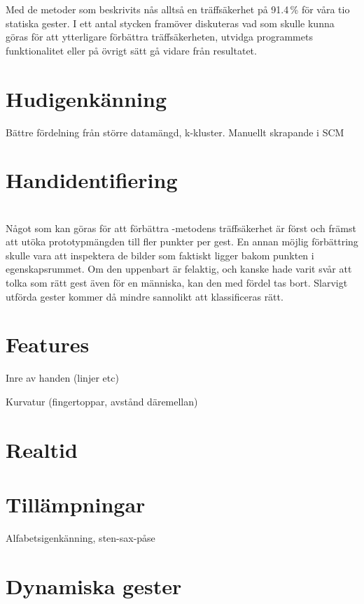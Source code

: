 \documentclass[../rapport_MVEX01-11-05]{subfiles}
\begin{document}
Med de metoder som beskrivits nås alltså en träffsäkerhet på 91.4\,\%
för våra tio statiska gester. I ett antal stycken framöver diskuteras
vad som skulle kunna göras för att ytterligare förbättra
träffsäkerheten, utvidga programmets funktionalitet eller på övrigt
sätt gå vidare från resultatet.

\section{Hudigenkänning}
Bättre fördelning från större datamängd, k-kluster.
Manuellt skrapande i SCM

\section{Handidentifiering}

\section{\knn}
Något som kan göras för att förbättra \knn-metodens träffsäkerhet är först och
främst att utöka prototypmängden till fler punkter per gest. En annan möjlig
förbättring skulle vara att inspektera de bilder som faktiskt ligger bakom
punkten i egenskapsrummet. Om den uppenbart är felaktig, och kanske hade varit
svår att tolka som rätt gest även för en människa, kan den med fördel tas bort.
Slarvigt utförda gester kommer då mindre sannolikt att
klassificeras rätt.

\section{Features}
Inre av handen (linjer etc)

Kurvatur (fingertoppar, avstånd däremellan)

\section{Realtid}
\section{Tillämpningar}
Alfabetsigenkänning, sten-sax-påse

\section{Dynamiska gester}
\end{document}
